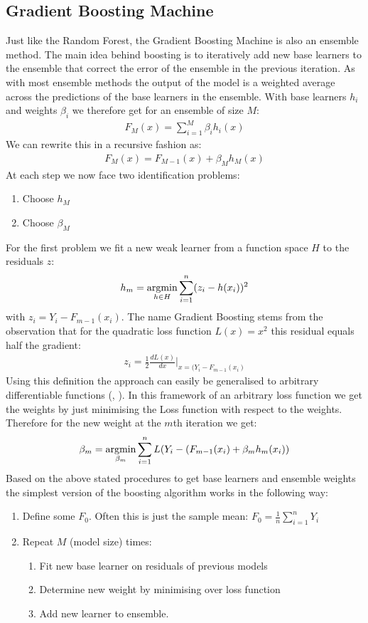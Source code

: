 \subsection{Gradient Boosting Machine}
Just like the Random Forest, the Gradient Boosting Machine is also an ensemble method. The main idea behind boosting is to iteratively add new base learners to the ensemble that correct the error of the ensemble in the previous iteration. As with most ensemble methods the output of the model is a weighted average across the predictions of the base learners in the ensemble. With base learners $h_i$ and weights $\beta_i$ we therefore get for an ensemble of size $M$:
\begin{align}
F_M(x) = \sum_{i = 1}^M \beta_i h_i(x)
\end{align}
We can rewrite this in a recursive fashion as:
\begin{align}
F_M(x) = F_{M-1}(x) + \beta_M h_M(x)
\end{align}
At each step we now face two identification problems:
\begin{enumerate}
\item Choose $h_M$
\item Choose $\beta_M$
\end{enumerate}
For the first problem we fit a new weak learner from a function space $H$ to the residuals $z$:
\begin{align}
h_m = \operatorname*{argmin}_{h \in H} \sum_{i = 1}^n (z_i - h(x_i))^2
\end{align}
with $z_i = Y_i - F_{m-1}(x_i)$. The name Gradient Boosting stems from the observation that for the quadratic loss function $L(x) = x^2$ this residual equals half the gradient:
\begin{align}
z_i = \frac{1}{2}\frac{dL(x)}{dx}|_{x = (Y_i - F_{m-1}(x_i)}
\end{align}
Using this definition the approach can easily be generalised to arbitrary differentiable functions (\cite{friedman_greedy_2001}, \cite{friedman_stochastic_2002}). 
In this framework of an arbitrary loss function we get the weights by just minimising the Loss function with respect to the weights. Therefore for the new weight at the $m$th iteration we get:
\begin{align}
\beta_m = \operatorname*{argmin}_{\beta_m} \sum_{i = 1}^n L(Y_i - (F_{m-1}(x_i) + \beta_m h_m(x_i))
\end{align}
Based on the above stated procedures to get base learners and ensemble weights the simplest version of the boosting algorithm works in the following way:
\begin{enumerate}
\item Define some $F_0$. Often this is just the sample mean: $F_0 = \frac{1}{n}\sum_{i=1}^n Y_i$
\item Repeat $M$ (model size) times:
\begin{enumerate}
\item Fit new base learner on residuals of previous models
\item Determine new weight by minimising over loss function
\item Add new learner to ensemble.
\end{enumerate}
\end{enumerate}
